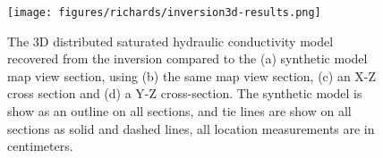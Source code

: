 \begin{figure}[ht]
\begin{center}
\texttt{[image: figures/richards/inversion3d-results.png]}
\end{center}
\caption{The 3D distributed saturated hydraulic conductivity model recovered from the inversion compared to the (a) synthetic model map view section, using (b) the same map view section, (c) an X-Z cross section and (d) a Y-Z cross-section. The synthetic model is show as an outline on all sections, and tie lines are show on all sections as solid and dashed lines, all location measurements are in centimeters.}
\label{fig:richards-inversion3d-results}
\end{figure}
